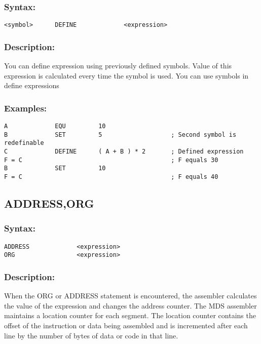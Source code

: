         \subsubsection{Syntax:}
        {
            \usecodefont
            \verb'<symbol>      DEFINE             <expression>'
        }
        \subsubsection{Description:}
            You can define expression using previously defined symbols. Value of this expression is calculated every time the symbol is used. You can use symbols in define expressions

        \subsubsection{Examples:}
        {
            \usecodefont
            \verb'A             EQU         10'\\
            \verb'B             SET         5                   ; Second symbol is redefinable'\\
            \verb'C             DEFINE      ( A + B ) * 2       ; Defined expression'\\
            \verb'F = C                                         ; F equals 30'\\
            \verb'B             SET         10'\\
            \verb'F = C                                         ; F equals 40'\\
        }

    \subsection{ADDRESS,ORG}
        \subsubsection{Syntax:}
        {
            \usecodefont
            \verb'ADDRESS             <expression>'\\
            \verb'ORG                 <expression>'
        }
        \subsubsection{Description:}
        When the ORG or ADDRESS statement is encountered, the assembler calculates the value of the expression and changes the address counter. The MDS assembler maintains a location counter for each segment. The location counter contains the offset of the instruction or data being assembled and is incremented after each line by the number of bytes of data or code in that line.

